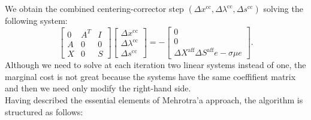 \documentclass[a4paper,10 pt,titlepage,twoside]{book}
\theoremstyle{plain}
\theoremstyle{definition}
\theoremstyle{remark}
\begin{document}
We obtain the combined centering-corrector step $(\Delta x^{\text{cc}}, \Delta \lambda^{\text{cc}}, \Delta s^{\text{cc}})$ solving the following system:
\begin{equation}\label{(C)}
\begin{bmatrix}
0&A^{T}&I \\A&0&0\\X&0&S
\end{bmatrix}\begin{bmatrix}
\Delta x^{\text{cc}}\\\Delta\lambda^{\text{cc}} \\\Delta s^{\text{cc}}
\end{bmatrix}=-\begin{bmatrix}
0\\0\\\Delta X^{\text{aff}}\Delta S^{\text{aff}}e - \sigma\mu e
\end{bmatrix}.
\end{equation}
Although we need to solve at each iteration two linear systems instead of one, the marginal cost is not great because the systems have the same coeffifient matrix and then we need only modify the right-hand side. \\
 Having described the essential elements of Mehrotra'a approach, the algorithm is structured as follows:
\\
\end{document}
